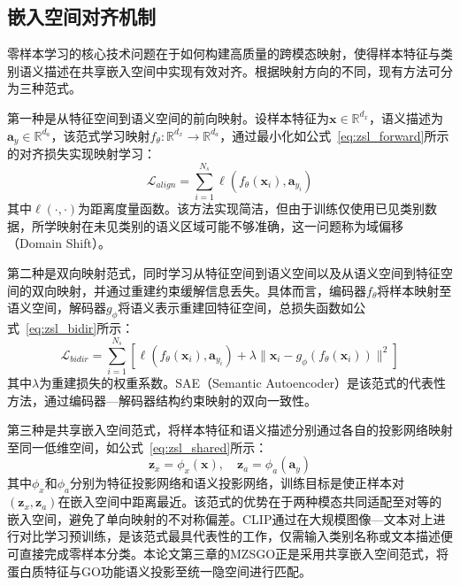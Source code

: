 \subsection{嵌入空间对齐机制}

零样本学习的核心技术问题在于如何构建高质量的跨模态映射，使得样本特征与类别语义描述在共享嵌入空间中实现有效对齐。根据映射方向的不同，现有方法可分为三种范式。

第一种是从特征空间到语义空间的前向映射。设样本特征为$\mathbf{x} \in \mathbb{R}^{d_x}$，语义描述为$\mathbf{a}_y \in \mathbb{R}^{d_a}$，该范式学习映射$f_\theta: \mathbb{R}^{d_x} \to \mathbb{R}^{d_a}$，通过最小化如公式~\eqref{eq:zsl_forward}所示的对齐损失实现映射学习：
\begin{equation}
\label{eq:zsl_forward}
\mathcal{L}_{align} = \sum_{i=1}^{N_s} \ell(f_\theta(\mathbf{x}_i), \mathbf{a}_{y_i})
\end{equation}
其中$\ell(\cdot, \cdot)$为距离度量函数。该方法实现简洁，但由于训练仅使用已见类别数据，所学映射在未见类别的语义区域可能不够准确，这一问题称为域偏移（Domain Shift）\cite{pourpanah2023review}。

第二种是双向映射范式，同时学习从特征空间到语义空间以及从语义空间到特征空间的双向映射，并通过重建约束缓解信息丢失。具体而言，编码器$f_\theta$将样本映射至语义空间，解码器$g_\phi$将语义表示重建回特征空间，总损失函数如公式~\eqref{eq:zsl_bidir}所示：
\begin{equation}
\label{eq:zsl_bidir}
\mathcal{L}_{bidir} = \sum_{i=1}^{N_s} \left[\ell(f_\theta(\mathbf{x}_i), \mathbf{a}_{y_i}) + \lambda \|\mathbf{x}_i - g_\phi(f_\theta(\mathbf{x}_i))\|^2\right]
\end{equation}
其中$\lambda$为重建损失的权重系数。SAE（Semantic Autoencoder）\cite{kodirov2017semantic}是该范式的代表性方法，通过编码器—解码器结构约束映射的双向一致性。

第三种是共享嵌入空间范式，将样本特征和语义描述分别通过各自的投影网络映射至同一低维空间，如公式~\eqref{eq:zsl_shared}所示：
\begin{equation}
\label{eq:zsl_shared}
\mathbf{z}_x = \phi_x(\mathbf{x}), \quad \mathbf{z}_a = \phi_a(\mathbf{a}_y)
\end{equation}
其中$\phi_x$和$\phi_a$分别为特征投影网络和语义投影网络，训练目标是使正样本对$(\mathbf{z}_x, \mathbf{z}_a)$在嵌入空间中距离最近。该范式的优势在于两种模态共同适配至对等的嵌入空间，避免了单向映射的不对称偏差。CLIP\cite{radford2021learning}通过在大规模图像—文本对上进行对比学习预训练，是该范式最具代表性的工作，仅需输入类别名称或文本描述便可直接完成零样本分类。本论文第三章的MZSGO正是采用共享嵌入空间范式，将蛋白质特征与GO功能语义投影至统一隐空间进行匹配。

